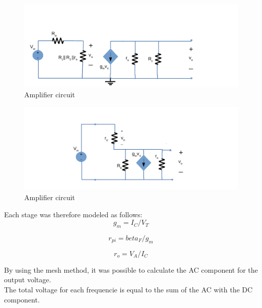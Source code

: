 \begin{figure} [!htb] 
  \includegraphics[width=\linewidth]{incrementalgain.pdf}
  \caption{Amplifier circuit}
  \label{fig:theoplots}
  \endminipage\hfill
\end{figure}

\begin{figure} [!htb] 
  \includegraphics[width=\linewidth]{incrementaloutput.pdf}
  \caption{Amplifier circuit}
  \label{fig:theoplots}
  \endminipage\hfill
\end{figure}

\FloatBarrier

Each stage was therefore modeled as follows:\\

\begin{equation}
 g_{m} = I_{C}/V_{T}
 \label{}
\end{equation} 

\begin{equation}
 r_{pi}= {beta}_{F}/g_{m}
   \label{}
\end{equation} 

\begin{equation}
  r_{o}= V_{A}/I_{C}
  \label{}
\end{equation} 

By using the mesh method, it was possible to calculate the AC component for the output voltage.\\
The total voltage for each frequencie is equal to the sum of the AC with the DC component.\\

